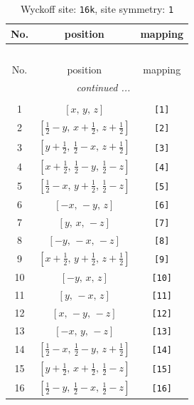 \documentclass[fleqn,8pt]{jsarticle}
\begin{document}
\begin{longtable}{ccc}
\caption{Wyckoff site: {\tt 16k}, site symmetry: {\tt 1}}
 \\
 \hline \hline
No. & position & mapping \\ \hline \endfirsthead

\multicolumn{2}{l}{\tablename\ \thetable{}} \\
 \hline \hline
No. & position & mapping \\ \hline \endhead

 \hline \hline
\multicolumn{2}{r}{\footnotesize\it continued ...} \\ \endfoot

 \hline \hline
\multicolumn{2}{r}{} \\ \endlastfoot

1 & $\left[ x,\, y,\, z \right]$ & {\tt [1]} \\ \hline
2 & $\left[ \frac{1}{2} - y,\, x + \frac{1}{2},\, z + \frac{1}{2} \right]$ & {\tt [2]} \\ \hline
3 & $\left[ y + \frac{1}{2},\, \frac{1}{2} - x,\, z + \frac{1}{2} \right]$ & {\tt [3]} \\ \hline
4 & $\left[ x + \frac{1}{2},\, \frac{1}{2} - y,\, \frac{1}{2} - z \right]$ & {\tt [4]} \\ \hline
5 & $\left[ \frac{1}{2} - x,\, y + \frac{1}{2},\, \frac{1}{2} - z \right]$ & {\tt [5]} \\ \hline
6 & $\left[ - x,\, - y,\, z \right]$ & {\tt [6]} \\ \hline
7 & $\left[ y,\, x,\, - z \right]$ & {\tt [7]} \\ \hline
8 & $\left[ - y,\, - x,\, - z \right]$ & {\tt [8]} \\ \hline
9 & $\left[ x + \frac{1}{2},\, y + \frac{1}{2},\, z + \frac{1}{2} \right]$ & {\tt [9]} \\ \hline
10 & $\left[ - y,\, x,\, z \right]$ & {\tt [10]} \\ \hline
11 & $\left[ y,\, - x,\, z \right]$ & {\tt [11]} \\ \hline
12 & $\left[ x,\, - y,\, - z \right]$ & {\tt [12]} \\ \hline
13 & $\left[ - x,\, y,\, - z \right]$ & {\tt [13]} \\ \hline
14 & $\left[ \frac{1}{2} - x,\, \frac{1}{2} - y,\, z + \frac{1}{2} \right]$ & {\tt [14]} \\ \hline
15 & $\left[ y + \frac{1}{2},\, x + \frac{1}{2},\, \frac{1}{2} - z \right]$ & {\tt [15]} \\ \hline
16 & $\left[ \frac{1}{2} - y,\, \frac{1}{2} - x,\, \frac{1}{2} - z \right]$ & {\tt [16]} \\
\end{longtable}
\end{document}
